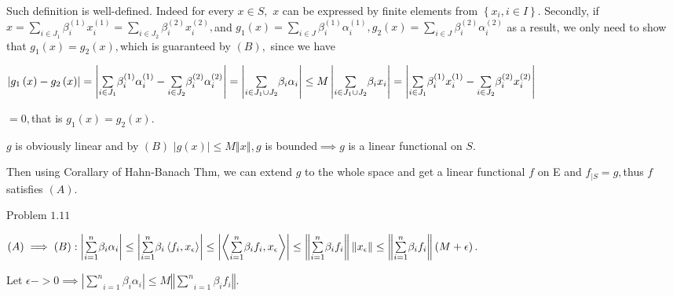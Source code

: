 \documentclass{article}
\begin{document}
Such definition is well-defined. Indeed for every $x\in S,$ $x$ can be
expressed by finite elements from $\left\{ x_{i},i\in I\right\} .$ Secondly,
if $x=\underset{i\in J_{1}}{\sum }\beta _{i}^{\left( 1\right) }x_{i}^{\left(
1\right) }=\underset{i\in J_{2}}{\sum }\beta _{i}^{\left( 2\right)
}x_{i}^{\left( 2\right) },$and $g_{1}\left( x\right) =\underset{i\in J}{\sum 
}\beta _{i}^{\left( 1\right) }\alpha _{i}^{\left( 1\right) },g_{2}\left(
x\right) =\underset{i\in J}{\sum }\beta _{i}^{\left( 2\right) }\alpha
_{i}^{\left( 2\right) }$ as a result, we only need to show that $g_{1}\left(
x\right) =g_{2}\left( x\right) ,$which is guaranteed by $\left( B\right) ,$%
since we have

$\left\vert g_{1}\left( x\right) -g_{2}\left( x\right) \right\vert
=\left\vert \underset{i\in J_{1}}{\sum }\beta _{i}^{\left( 1\right) }\alpha
_{i}^{\left( 1\right) }-\underset{i\in J_{2}}{\sum }\beta _{i}^{\left(
2\right) }\alpha _{i}^{\left( 2\right) }\right\vert =\left\vert \underset{%
i\in J_{1}\cup J_{2}}{\sum }\beta _{i}\alpha _{i}\right\vert \leq
M\left\vert \underset{i\in J_{1}\cup J_{2}}{\sum }\beta _{i}x_{i}\right\vert
=\left\vert \underset{i\in J_{1}}{\sum }\beta _{i}^{\left( 1\right)
}x_{i}^{\left( 1\right) }-\underset{i\in J_{2}}{\sum }\beta _{i}^{\left(
2\right) }x_{i}^{\left( 2\right) }\right\vert $

$=0,$that is $g_{1}\left( x\right) =g_{2}\left( x\right) .$

$g$ is obviously linear and by $\left( B\right) $ $\left\vert g\left(
x\right) \right\vert \leq M\left\Vert x\right\Vert ,g$ is bounded$\implies g$
is a linear functional on $S.$

Then using Corallary of Hahn-Banach Thm, we can extend $g$ to the whole
space and get a linear functional $f$ on E and $f_{|S}=g,$thus $f$ satisfies 
$\left( A\right) .$

Problem $1.11$

$\left( A\right) \implies \left( B\right) :\left\vert \underset{i=1}{\overset%
{n}{\sum }}\beta _{i}\alpha _{i}\right\vert \leq \left\vert \underset{i=1}{%
\overset{n}{\sum }}\beta _{i}\left\langle f_{i},x_{\epsilon }\right\rangle
\right\vert \leq \left\vert \left\langle \underset{i=1}{\overset{n}{\sum }}%
\beta _{i}f_{i},x_{\epsilon }\right\rangle \right\vert \leq \left\Vert 
\underset{i=1}{\overset{n}{\sum }}\beta _{i}f_{i}\right\Vert \left\Vert
x_{\epsilon }\right\Vert \leq \left\Vert \underset{i=1}{\overset{n}{\sum }}%
\beta _{i}f_{i}\right\Vert \left( M+\epsilon \right) .$

Let $\epsilon ->0\implies \left\vert \underset{i=1}{\overset{n}{\sum }}\beta
_{i}\alpha _{i}\right\vert \leq M\left\Vert \underset{i=1}{\overset{n}{\sum }%
}\beta _{i}f_{i}\right\Vert .$
\end{document}
